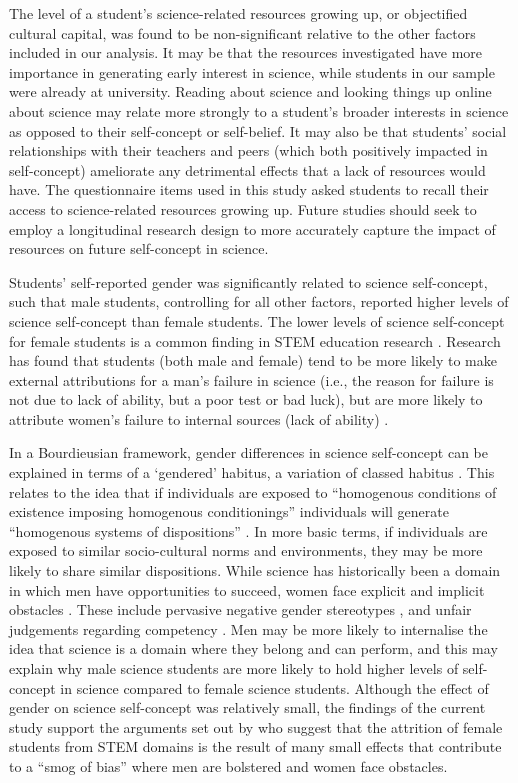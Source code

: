 The level of a student's science-related resources growing up, or objectified cultural capital, was found to be non-significant relative to the other factors included in our analysis. It may be that the resources investigated have more importance in generating early interest in science, while students in our sample were already at university. Reading about science and looking things up online about science may relate more strongly to a student's broader interests in science as opposed to their self-concept or self-belief. It may also be that students' social relationships with their teachers and peers (which both positively impacted in self-concept) ameliorate any detrimental effects that a lack of resources would have. The questionnaire items used in this study asked students to recall their access to science-related resources growing up. Future studies should seek to employ a longitudinal research design to more accurately capture the impact of resources on future self-concept in science. 

Students' self-reported gender was significantly related to science self-concept, such that male students, controlling for all other factors, reported higher levels of science self-concept than female students. The lower levels of science self-concept for female students is a common finding in STEM education research \citep{sax2015but,Ellis_2016}. Research has found that students (both male and female) tend to be more likely to make external attributions for a man's failure in science (i.e., the reason for failure is not due to lack of ability, but a poor test or bad luck), but are more likely to attribute women's failure to internal sources (lack of ability) \citep{LaCosse_2016}. 

In a Bourdieusian framework, gender differences in science self-concept can be explained in terms of a `gendered' habitus, a variation of classed habitus \citep{Reay_2004}. This relates to the idea that if individuals are exposed to ``homogenous conditions of existence imposing homogenous conditionings'' individuals will generate ``homogenous systems of dispositions'' \cite[p.101]{Bourdieu1984}. In more basic terms, if individuals are exposed to similar socio-cultural norms and environments, they may be more likely to share similar dispositions. While science has historically been a domain in which men have opportunities to succeed, women face explicit and implicit obstacles \citep{cheryan2017some,Blickenstaff_2005}. These include pervasive negative gender stereotypes \citep{Nosek_2009}, and unfair judgements regarding competency \citep{Moss_2012,Barthelemy_2016}. Men may be more likely to internalise the idea that science is a domain where they belong and can perform, and this may explain why male science students are more likely to hold higher levels of self-concept in science compared to female science students. Although the effect of gender on science self-concept was relatively small, the findings of the current study support the arguments set out by \cite{Kost_Smith_2010} who suggest that the attrition of female students from STEM domains is the result of many small effects that contribute to a ``smog of bias'' where men are bolstered and women face obstacles. 

